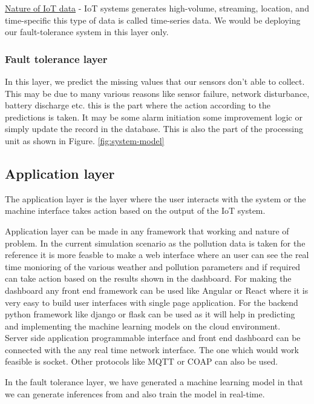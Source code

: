 \underline{Nature of IoT data} - IoT systems generates high-volume, streaming, location, and time-specific this type of data is called time-series data. 
We would be deploying our fault-tolerance system in this layer only.

\subsubsection{Fault tolerance layer}
In this layer, we predict the missing values that our sensors don’t able to collect. This may be due to many various reasons like sensor failure, network disturbance, battery discharge etc. this is the part where the action according to the predictions is taken. It may be some alarm initiation some improvement logic or simply update the record in the database. This is also the part of the processing unit as shown in Figure. \ref{fig:system-model}

\subsection{Application layer}
The application layer is the layer where the user interacts with the system or the machine interface takes action based on the output of the IoT system. 

Application layer can be made in any framework that working and nature of problem. In the current simulation scenario as the pollution data is taken for the reference it is more feasble to make a web interface where an user can see the real time monioring of the various weather and pollution parameters and if required can take action based on the results shown in the dashboard. For making the dashboard any front end framework can be used like Angular or React where it is very easy to build user interfaces with single page application. For the backend python framework like django or flask can be used as it will help in predicting and implementing the machine learning models on the cloud environment.
\\
Server side application programmable interface and front end dashboard can be connected with the any real time network interface. The one which would work feasible is socket. Other protocols like MQTT or COAP can also be used.

In the fault tolerance layer, we have generated a machine learning model in that we can generate inferences from and also train the model in real-time.




